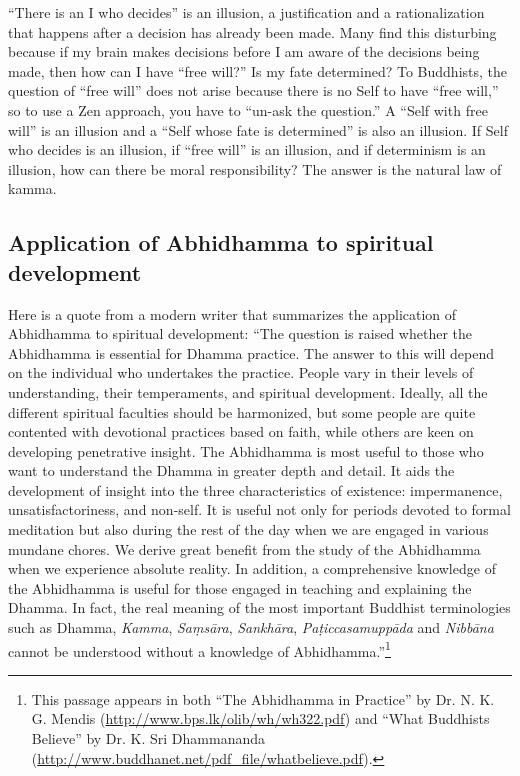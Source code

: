 “There is an I who decides” is an illusion, a justification and a rationalization that happens after a decision has already been made. Many find this disturbing because if my brain makes decisions before I am aware of the decisions being made, then how can I have “free will?” Is my fate determined? To Buddhists, the question of “free will” does not arise because there is no Self to have “free will,” so to use a Zen approach, you have to “un-ask the question.” A “Self with free will” is an illusion and a “Self whose fate is determined” is also an illusion. If Self who decides is an illusion, if “free will” is an illusion, and if determinism is an illusion, how can there be moral responsibility? The answer is the natural law of kamma.

\pagebreak

\subsection*{Application of Abhidhamma to spiritual development}

Here is a quote from a modern writer that summarizes the application of Abhidhamma to spiritual development: “The question is raised whether the Abhidhamma is essential for Dhamma practice. The answer to this will depend on the individual who undertakes the practice. People vary in their levels of understanding, their temperaments, and spiritual development. Ideally, all the different spiritual faculties should be harmonized, but some people are quite contented with devotional practices based on faith, while others are keen on developing penetrative insight. The Abhidhamma is most useful to those who want to understand the Dhamma in greater depth and detail. It aids the development of insight into the three characteristics of existence: impermanence, unsatisfactoriness, and non-self. It is useful not only for periods devoted to formal meditation but also during the rest of the day when we are engaged in various mundane chores. We derive great benefit from the study of the Abhidhamma when we experience absolute reality. In addition, a comprehensive knowledge of the Abhidhamma is useful for those engaged in teaching and explaining the Dhamma. In fact, the real meaning of the most important Buddhist terminologies such as Dhamma, \textit{Kamma}, \textit{Saṃsāra}, \textit{Sankhāra}, \textit{Paṭiccasamuppāda} and \textit{Nibbāna} cannot be understood without a knowledge of Abhidhamma.”\footnote{This passage appears in both “The Abhidhamma in Practice” by Dr. N. K. G. Mendis (\url{http://www.bps.lk/olib/wh/wh322.pdf}) and “What Buddhists Believe” by Dr. K. Sri Dhammananda (\url{http://www.buddhanet.net/pdf_file/whatbelieve.pdf}).}

